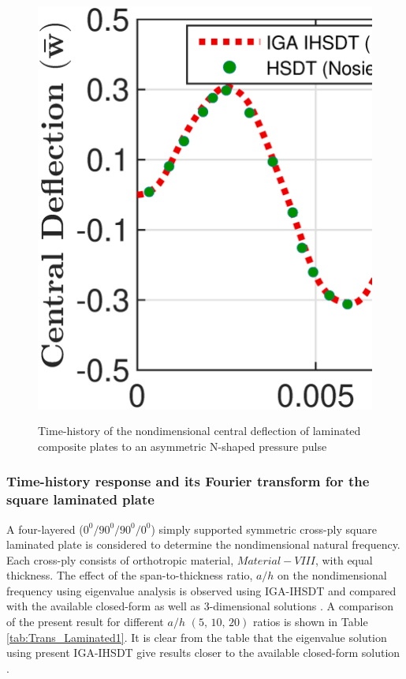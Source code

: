 \documentclass[3p,preprint,12pt]{elsarticle}
\begin{document}
\begin{figure}
\begin{minipage}{\textwidth}
		{\includegraphics[scale=0.3]{Structure_b_2_5_Tri_IGA_NPSDT_Transient_h_By_a_1_20.eps}}
	\end{minipage}
	\caption{Time-history of the nondimensional	central deflection of laminated composite plates to an asymmetric N-shaped pressure pulse}
	\label{fig:Transient_triangular}
\end{figure}

\subsubsection{Time-history response and its Fourier transform for the square laminated plate}
A four-layered ($0^0/90^0/90^0/0^0$) simply supported symmetric cross-ply square laminated plate is considered to determine the nondimensional natural frequency. Each cross-ply consists of orthotropic material, $Material-VIII$, with equal thickness. The effect of the span-to-thickness ratio, $a/h$ on the nondimensional frequency using eigenvalue analysis is observed using IGA-IHSDT and compared with the available closed-form \cite{kulkarni2008free, grover2013new} as well as 3-dimensional solutions \cite{kulkarni2008free}. A comparison of the present result for different $a/h$ $(5,\,10,\,20)$ ratios is shown in Table \ref{tab:Trans_Laminated1}. It is clear from the table that the eigenvalue solution using present IGA-IHSDT give results closer to the available closed-form solution \cite{grover2013new}.
\end{document}

